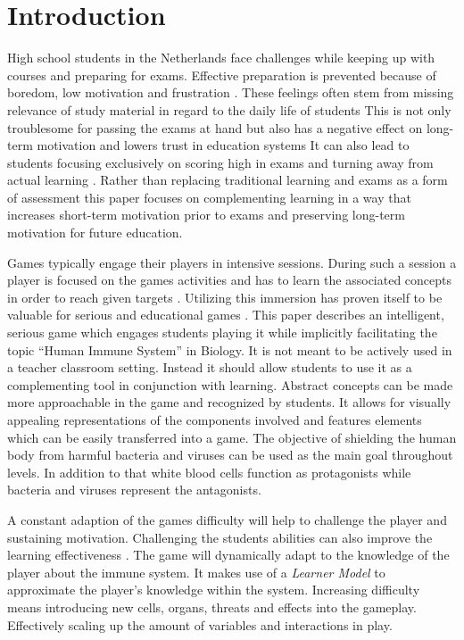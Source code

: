\section{Introduction}
High school students in the Netherlands face challenges while keeping up with courses and preparing for exams.
Effective preparation is prevented because of boredom, low motivation and frustration \cite{Ford2013,Shernoff2003StudentTheory.}.
These feelings often stem from missing relevance of study material in regard to the daily life of students \cite{Shernoff2003StudentTheory.}
This is not only troublesome for passing the exams at hand but also has a negative effect on long-term motivation and lowers trust in education systems \cite{Ford2013}
It can also lead to students focusing exclusively on scoring high in exams and turning away from actual learning \cite{Fitzgerald2000TestsStudents}.
Rather than replacing traditional learning and exams as a form of assessment this paper focuses on complementing learning in a way that increases short-term motivation prior to exams and preserving long-term motivation for future education.

Games typically engage their players in intensive sessions. During such a session a player is focused on the games activities and has to learn the associated concepts in order to reach given targets \cite{Przybylski2010AEngagement.}. Utilizing this immersion has proven itself to be valuable for serious and educational games \cite{Garris2002}.
This paper describes an intelligent, serious game which engages students playing it while implicitly facilitating the topic \enquote{Human Immune System} in Biology.
It is not meant to be actively used in a teacher classroom setting. Instead it should allow students to use it as a complementing tool in conjunction with learning.
Abstract concepts can be made more approachable in the game and recognized by students. It allows for visually appealing representations of the components involved and features elements which can be easily transferred into a game. The objective of shielding the human body from harmful bacteria and viruses can be used as the main goal throughout levels. In addition to that white blood cells function as protagonists while bacteria and viruses represent the antagonists.

A constant adaption of the games difficulty will help to challenge the player and sustaining motivation. Challenging the students abilities can also improve the learning effectiveness \cite{Hamari2016}.
The game will dynamically adapt to the knowledge of the player about the immune system. It makes use of a \textit{Learner Model}\cite{Nguyen2008LearnerLearning} to approximate the player's knowledge within the system. Increasing difficulty means introducing new cells, organs, threats and effects into the gameplay. Effectively scaling up the amount of variables and interactions in play.

